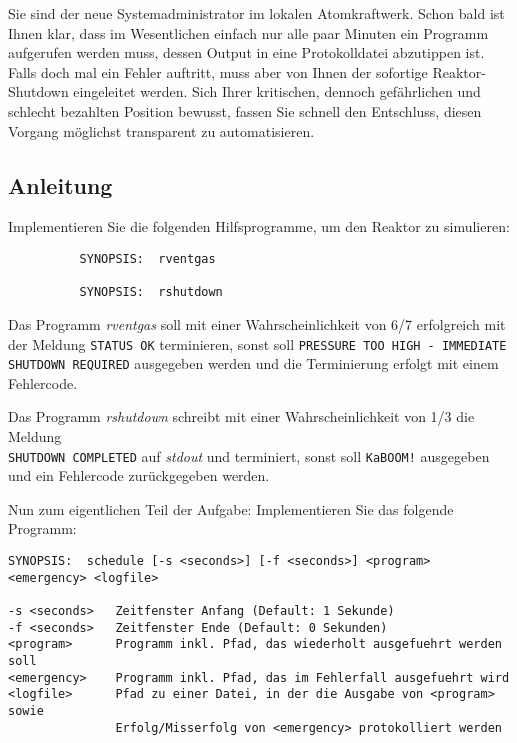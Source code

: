 




Sie sind der neue Systemadministrator im lokalen Atomkraftwerk. Schon bald ist
Ihnen klar, dass im Wesentlichen einfach nur alle paar Minuten ein Programm
aufgerufen werden muss, dessen Output in eine Protokolldatei abzutippen ist.
Falls doch mal ein Fehler auftritt, muss aber von Ihnen der sofortige
Reaktor-Shutdown eingeleitet werden. Sich Ihrer kritischen, dennoch gefährlichen
und schlecht bezahlten Position bewusst, fassen Sie schnell den Entschluss,
diesen Vorgang möglichst transparent zu automatisieren.

\subsection*{Anleitung}
Implementieren Sie die folgenden Hilfsprogramme, um den Reaktor zu simulieren:

\begin{verbatim}
          SYNOPSIS:  rventgas

          SYNOPSIS:  rshutdown
\end{verbatim}

Das Programm \emph{rventgas} soll mit einer Wahrscheinlichkeit von 6/7
erfolgreich mit der Meldung \verb_STATUS OK_ terminieren, sonst soll
\verb_PRESSURE TOO HIGH - IMMEDIATE SHUTDOWN REQUIRED_ ausgegeben werden und die
Terminierung erfolgt mit einem Fehlercode.

Das Programm \emph{rshutdown} schreibt mit einer Wahrscheinlichkeit von 1/3 die
Meldung\\
\verb_SHUTDOWN COMPLETED_ auf \emph{stdout} und terminiert, sonst soll
\verb_KaBOOM!_ ausgegeben und ein Fehlercode zurückgegeben werden.

Nun zum eigentlichen Teil der Aufgabe: Implementieren Sie das folgende Programm:

\begin{verbatim}
SYNOPSIS:  schedule [-s <seconds>] [-f <seconds>] <program> <emergency> <logfile>

-s <seconds>   Zeitfenster Anfang (Default: 1 Sekunde)
-f <seconds>   Zeitfenster Ende (Default: 0 Sekunden)
<program>      Programm inkl. Pfad, das wiederholt ausgefuehrt werden soll
<emergency>    Programm inkl. Pfad, das im Fehlerfall ausgefuehrt wird
<logfile>      Pfad zu einer Datei, in der die Ausgabe von <program> sowie
               Erfolg/Misserfolg von <emergency> protokolliert werden
\end{verbatim}

